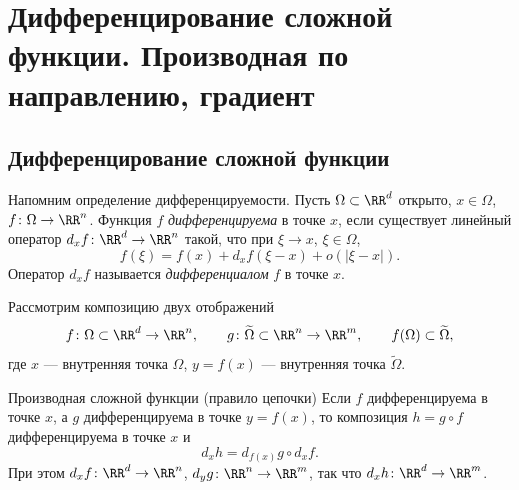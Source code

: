 
\section{Дифференцирование сложной функции. Производная по направлению, градиент}

\subsection*{Дифференцирование сложной функции}

Напомним определение дифференцируемости. Пусть $\Omega\subset\RR^d$ открыто,
$x\in\Omega$, $f\colon\Omega\to\RR^n$. Функция $f$ \emph{дифференцируема} в точке
$x$, если существует линейный оператор $d_xf\colon\RR^d\to\RR^n$ такой, что при
$\xi\to x$, $\xi\in\Omega$,
\[
f(\xi)=f(x)+d_xf(\xi-x)+o(|\xi-x|).
\]
Оператор $d_xf$ называется \emph{дифференциалом} $f$ в точке $x$.

Рассмотрим композицию двух отображений
\[
f\colon\Omega\subset\RR^d\to\RR^n,
\qquad
g\colon\widetilde\Omega\subset\RR^n\to\RR^m,
\qquad
f(\Omega)\subset\widetilde\Omega,
\]
где $x$ --- внутренняя точка $\Omega$, $y=f(x)$ --- внутренняя точка $\widetilde\Omega$.

\begin{Theorem}{Производная сложной функции (правило цепочки)}{}
	Если $f$ дифференцируема в точке $x$, а $g$ дифференцируема в точке $y=f(x)$,
	то композиция $h=g\circ f$ дифференцируема в точке $x$ и
	\[
	d_x h = d_{f(x)}g\circ d_xf.
	\]
	При этом $d_xf\colon\RR^d\to\RR^n$, $d_yg\colon\RR^n\to\RR^m$, так что
	$d_x h\colon\RR^d\to\RR^m$.
\end{Theorem}

